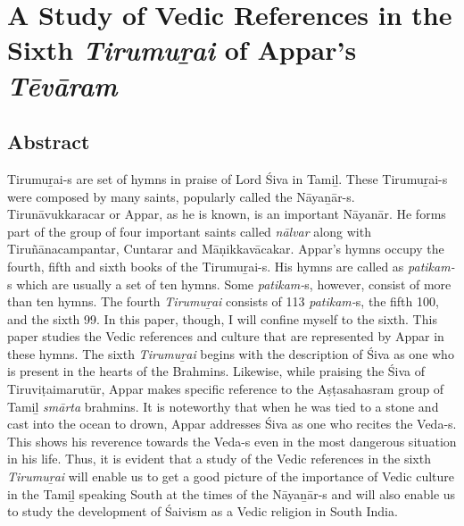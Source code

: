 
\chapter{A Study of Vedic References in the Sixth \textit{Tirumuṟai} of Appar’s \textit{Tēvāram}}\label{chap03}



\section*{Abstract}

Tirumuṟai-s are set of hymns in praise of Lord Śiva in Tamiḻ. These Tirumuṟai-s were composed by many saints, popularly called the Nāyaṉār-s. Tirunāvukkaracar or Appar, as he is known, is an important Nāyanār. He forms part of the group of four important saints called \textit{nālvar} along with Tiruñānacampantar, Cuntarar and Māṇikkavācakar. Appar’s hymns occupy the fourth, fifth and sixth books of the Tirumuṟai-s. His hymns are called as \textit{patikam-}s which are usually a set of ten hymns. Some \textit{patikam-}s, however, consist of more than ten hymns. The fourth \textit{Tirumuṟai} consists of 113 \textit{patikam-}s, the fifth 100, and the sixth 99. In this paper, though, I will confine myself to the sixth. This paper studies the Vedic references and culture that are represented by Appar in these hymns. The sixth \textit{Tirumuṟai} begins with the description of Śiva as one who is present in the hearts of the Brahmins. Likewise, while praising the Śiva of Tiruviṭaimarutūr, Appar makes specific reference to the Aṣṭasahasram group of Tamiḻ \textit{smārta} brahmins. It is noteworthy that when he was tied to a stone and cast into the ocean to drown, Appar addresses Śiva as one who recites the Veda-s. This shows his reverence towards the Veda-s even in the most dangerous situation in his life. Thus, it is evident that a study of the Vedic references in the sixth \textit{Tirumuṟai} will enable us to get a good picture of the importance of Vedic culture in the Tamiḻ speaking South at the times of the Nāyaṉār-s and will also enable us to study the development of Śaivism as a Vedic religion in South India.

